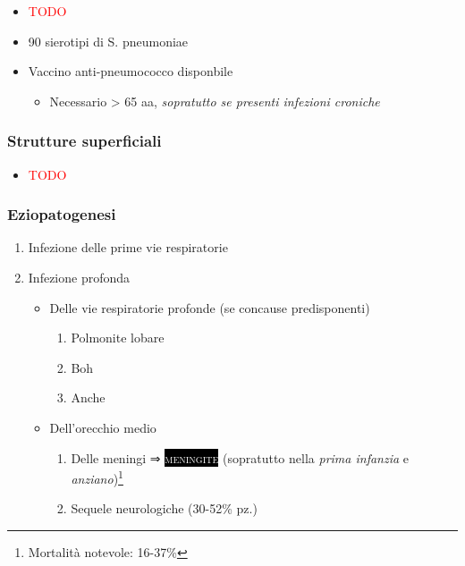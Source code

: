 \documentclass[italian,]{article}
\providecommand{\tightlist}{%
  \setlength{\itemsep}{0pt}\setlength{\parskip}{0pt}}
\newcommand{\pat}[1]{\colorbox{black}{\textcolor{white}{\textsc{#1}}}}
\newcommand{\TODO}[1]{\textcolor{red}{\textsf{\footnotesize{TODO #1}}}} %
\begin{document}
\begin{itemize}
\item
  \TODO{}
\item
  90 sierotipi di S. pneumoniae
\item
  Vaccino anti-pneumococco disponbile

  \begin{itemize}
  \tightlist
  \item
    Necessario \textgreater{} 65 aa, \emph{sopratutto se presenti
    infezioni croniche}
  \end{itemize}
\end{itemize}

\hypertarget{strutture-superficiali-1}{%
\subsubsection{Strutture superficiali}\label{strutture-superficiali-1}}

\begin{itemize}
\item
  \TODO{}
\end{itemize}

\hypertarget{eziopatogenesi}{%
\subsubsection{Eziopatogenesi}\label{eziopatogenesi}}

\begin{enumerate}
\def\labelenumi{\arabic{enumi}.}
\setcounter{enumi}{-1}
\tightlist
\item
  Infezione delle prime vie respiratorie
\item
  Infezione profonda

  \begin{itemize}
  \tightlist
  \item
    Delle vie respiratorie profonde (se concause predisponenti)

    \begin{enumerate}
    \def\labelenumii{\arabic{enumii}.}
    \setcounter{enumii}{1}
    \tightlist
    \item
      Polmonite lobare
    \item
      Boh
    \item
      Anche
    \end{enumerate}
  \item
    Dell'orecchio medio

    \begin{enumerate}
    \def\labelenumii{\arabic{enumii}.}
    \setcounter{enumii}{1}
    \tightlist
    \item
      Delle meningi ⇒ \pat{meningite} (sopratutto nella \emph{prima
      infanzia} e \emph{anziano})\footnote{Mortalità notevole: 16-37\%}
    \item
      Sequele neurologiche (30-52\% pz.)
    \end{enumerate}
  \end{itemize}
\end{enumerate}
\end{document}
